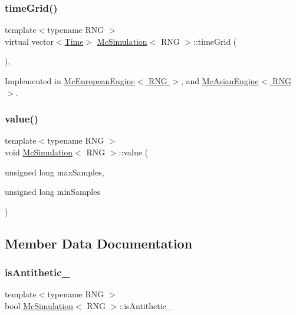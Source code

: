 \subsubsection{\texorpdfstring{time\+Grid()}{timeGrid()}}
{\footnotesize\ttfamily template$<$typename R\+NG $>$ \\
virtual vector$<$\hyperlink{_name_def_8h_ac2d3e0ba793497bcca555c7c2cf64ff3}{Time}$>$ \hyperlink{class_mc_simulation}{Mc\+Simulation}$<$ R\+NG $>$\+::time\+Grid (\begin{DoxyParamCaption}{ }\end{DoxyParamCaption})\hspace{0.3cm}{\ttfamily [private]}, {}}



Implemented in \hyperlink{class_mc_european_engine_a0c81d3320dc3567596b41d91444f5f54}{Mc\+European\+Engine$<$ R\+N\+G $>$}, and \hyperlink{class_mc_asian_engine_ad8d2c8721172ab1d7327db91a26c5052}{Mc\+Asian\+Engine$<$ R\+N\+G $>$}.

\hypertarget{class_mc_simulation_a476b6d633c6ebb742d6d26a62a6a3810}{}\label{class_mc_simulation_a476b6d633c6ebb742d6d26a62a6a3810} 
\subsubsection{\texorpdfstring{value()}{value()}}
{\footnotesize\ttfamily template$<$typename R\+NG $>$ \\
void \hyperlink{class_mc_simulation}{Mc\+Simulation}$<$ R\+NG $>$\+::value (\begin{DoxyParamCaption}\item[{unsigned long}]{max\+Samples,  }\item[{unsigned long}]{min\+Samples }\end{DoxyParamCaption})}



\subsection{Member Data Documentation}
\hypertarget{class_mc_simulation_a42eb4d165bfdfae218b4508e2321c4a3}{}\label{class_mc_simulation_a42eb4d165bfdfae218b4508e2321c4a3} 
\subsubsection{\texorpdfstring{is\+Antithetic\+\_\+}{isAntithetic\_}}
{\footnotesize\ttfamily template$<$typename R\+NG $>$ \\
bool \hyperlink{class_mc_simulation}{Mc\+Simulation}$<$ R\+NG $>$\+::is\+Antithetic\+\_\+\hspace{0.3cm}{\ttfamily [private]}}


